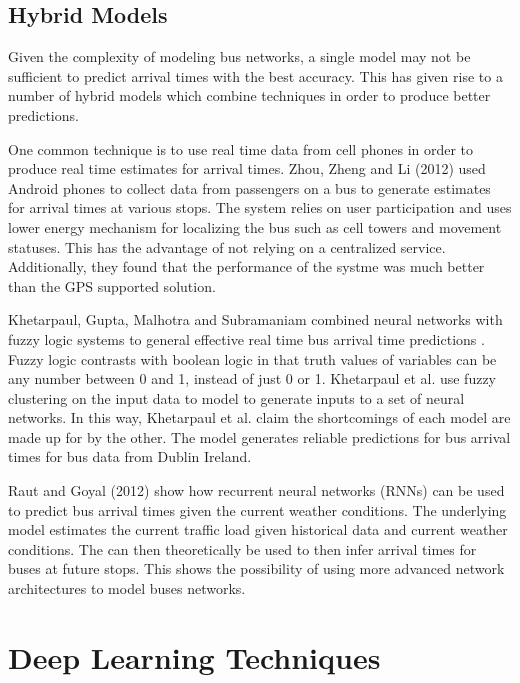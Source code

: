 \subsection{Hybrid Models}

Given the complexity of modeling bus networks, a single model may not be sufficient to predict arrival times with the best accuracy.
This has given rise to a number of hybrid models which combine techniques in order to produce better predictions.

One common technique is to use real time data from cell phones in order to produce real time estimates for arrival times.
Zhou, Zheng and Li (2012) used Android phones to collect data from passengers on a bus to generate estimates for arrival times at various stops\cite{zhou2012long}.
The system relies on user participation and uses lower energy mechanism for localizing the bus such as cell towers and movement statuses.
This has the advantage of not relying on a centralized service.
Additionally, they found that the performance of the systme was much better than the GPS supported solution.

Khetarpaul, Gupta, Malhotra and Subramaniam combined neural networks with fuzzy logic systems to general effective real time bus arrival time predictions \cite{khetarpaul2015bus}.
Fuzzy logic contrasts with boolean logic in that truth values of variables can be any number between 0 and 1, instead of just 0 or 1.
Khetarpaul et al. use fuzzy clustering on the input data to model to generate inputs to a set of neural networks.
In this way, Khetarpaul et al. claim the shortcomings of each model are made up for by the other.
The model generates reliable predictions for bus arrival times for bus data from Dublin Ireland.

Raut and Goyal (2012) show how recurrent neural networks (RNNs) can be used to predict bus arrival times given the current weather conditions\cite{raut2012public}.
The underlying model estimates the current traffic load given historical data and current weather conditions.
The can then theoretically be used to then infer arrival times for buses at future stops.
This shows the possibility of using more advanced network architectures to model buses networks.

\section{Deep Learning Techniques}

